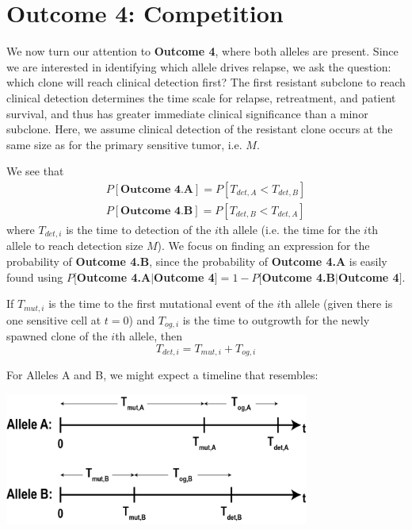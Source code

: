 \documentclass{article}
\begin{document}
\section{Outcome 4: Competition}

We now turn our attention to \textbf{Outcome 4}, where both alleles are present.  Since we are interested in identifying which allele drives relapse, we ask the question: which clone will reach clinical detection first?  The first resistant subclone to reach clinical detection determines the time scale for relapse, retreatment, and patient survival, and thus has greater immediate clinical significance than a minor subclone.  Here, we assume clinical detection of the resistant clone occurs at the same size as for the primary sensitive tumor, i.e. $M$.

We see that
\begin{equation}
\begin{split}
P[\textbf{Outcome 4.A}] = P[T_{det,A} < T_{det,B}] \\
P[\textbf{Outcome 4.B}] = P[T_{det,B} < T_{det,A}]
\end{split}
\end{equation}
where $T_{det,i}$ is the time to detection of the $i$th allele (i.e. the time for the $i$th allele to reach detection size $M$).  We focus on finding an expression for the probability of \textbf{Outcome 4.B}, since the probability of \textbf{Outcome 4.A} is easily found using $P[$\textbf{Outcome 4.A}$|$\textbf{Outcome 4}$] = 1 - P[$\textbf{Outcome 4.B}$|$\textbf{Outcome 4}$]$.

If $T_{mut,i}$ is the time to the first mutational event of the $i$th allele (given there is one sensitive cell at $t=0$) and $T_{og,i}$ is the time to outgrowth for the newly spawned clone of the $i$th allele, then
\begin{equation}
T_{det,i} = T_{mut,i} + T_{og,i}
\end{equation}

For Alleles A and B, we might expect a timeline that resembles:
\begin{center}
\includegraphics[width=0.75\textwidth]{TwoAlleleTimeline}
\end{center}
\end{document}
